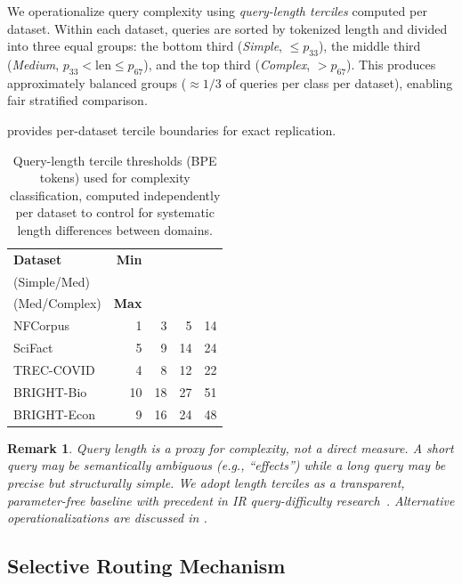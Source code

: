 \documentclass[12pt]{article}
\newtheorem{remark}{Remark}
\newcommand{\eg}{\textit{e.g.}}
\begin{document}
We operationalize query complexity using \emph{query-length terciles} computed
per dataset.  Within each dataset, queries are sorted by tokenized length and
divided into three equal groups: the bottom third (\emph{Simple}, $\le p_{33}$),
the middle third (\emph{Medium}, $p_{33} < \mathrm{len} \le p_{67}$), and the
top third (\emph{Complex}, $> p_{67}$).  This produces approximately balanced
groups ($\approx 1/3$ of queries per class per dataset), enabling fair
stratified comparison.

 provides per-dataset tercile boundaries
for exact replication.

\begin{table}[htbp]
\caption{Query-length tercile thresholds (BPE tokens) used for complexity
         classification, computed independently per dataset to control for
         systematic length differences between domains.}
\label{tab:complexity_thresholds}
\centering
\small
\renewcommand{\arraystretch}{1.3}
\begin{tabular}{@{}lrrrr@{}}
\toprule
\textbf{Dataset} & \textbf{Min} & \makecell{\textbf{$p_{33}$}\\(Simple/Med)} &
\makecell{\textbf{$p_{67}$}\\(Med/Complex)} & \textbf{Max} \\
\midrule
NFCorpus    &  1 &  3 &  5 & 14  \\
SciFact     &  5 &  9 & 14 & 24  \\
TREC-COVID  &  4 &  8 & 12 & 22  \\
BRIGHT-Bio  & 10 & 18 & 27 & 51  \\
BRIGHT-Econ &  9 & 16 & 24 & 48  \\
\bottomrule
\end{tabular}
\end{table}

\begin{remark}
  Query length is a proxy for complexity, not a direct measure.  A short query
  may be semantically ambiguous (\eg, ``effects'') while a long query may be
  precise but structurally simple.  We adopt length terciles as a transparent,
  parameter-free baseline with precedent in IR query-difficulty
  research~\citep{cronen2002predicting}.  Alternative operationalizations are
  discussed in .
\end{remark}

\subsection{Selective Routing Mechanism}
\label{sec:routing}
\end{document}
